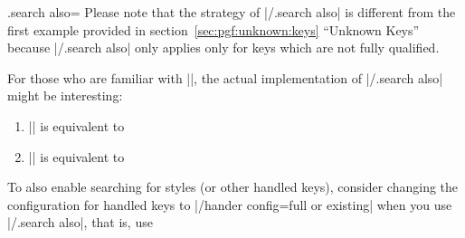 \begin{handler}{{.search also}=}
  Please note that the strategy of |/.search also| is different from
  the first example provided in section~\ref{sec:pgf:unknown:keys}
  ``Unknown Keys'' because |/.search also| only applies only for keys
  which are not fully qualified. 
	

  For those who are familiar with |\pgfkeys|, the actual
  implementation of |/.search also| might be interesting: 
  \begin{enumerate}
  \item || is equivalent to
\begin{codeexample}
\end{codeexample}
  \item || is equivalent to
\begin{codeexample}
\end{codeexample}
  \end{enumerate}

  To also enable searching for styles (or other handled keys),
  consider changing the configuration for handled keys to
  |/hander config=full or existing| when you use |/.search also|,
  that is, use  
\begin{codeexample}
\end{codeexample}
\end{handler}



